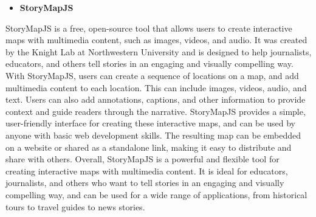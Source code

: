  \begin{itemize}
                \item \textbf{StoryMapJS}
 \end{itemize}

 StoryMapJS is a free, open-source tool that allows users to create interactive maps with multimedia content, such as images, videos, and audio. It was created by the Knight Lab at Northwestern University and is designed to help journalists, educators, and others tell stories in an engaging and visually compelling way.
With StoryMapJS, users can create a sequence of locations on a map, and add multimedia content to each location. This can include images, videos, audio, and text. Users can also add annotations, captions, and other information to provide context and guide readers through the narrative.
StoryMapJS provides a simple, user-friendly interface for creating these interactive maps, and can be used by anyone with basic web development skills. The resulting map can be embedded on a website or shared as a standalone link, making it easy to distribute and share with others.
Overall, StoryMapJS is a powerful and flexible tool for creating interactive maps with multimedia content. It is ideal for educators, journalists, and others who want to tell stories in an engaging and visually compelling way, and can be used for a wide range of applications, from historical tours to travel guides to news stories.